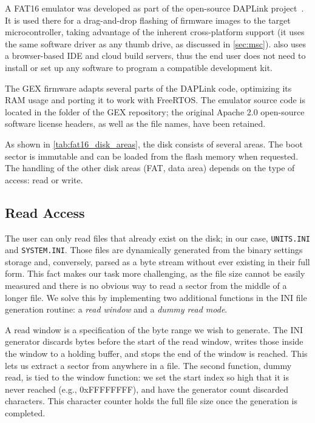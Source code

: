 A FAT16 emulator was developed as part of the open-source \mbed DAPLink project~\cite{daplink}. It is used there for a drag-and-drop flashing of firmware images to the target microcontroller, taking advantage of the inherent cross-platform support (it uses the same software driver as any thumb drive, as discussed in \cref{sec:msc}). \mbed also uses a browser-based \gls{IDE} and cloud build servers, thus the end user does not need to install or set up any software to program a compatible development kit.

The GEX firmware adapts several parts of the DAPLink code, optimizing its \gls{RAM} usage and porting it to work with FreeRTOS. The emulator source code is located in the  folder of the GEX repository; the original Apache 2.0 open-source software license headers, as well as the file names, have been retained.

As shown in \cref{tab:fat16_disk_areas}, the disk consists of several areas. The boot sector is immutable and can be loaded from the flash memory when requested. The handling of the other disk areas (\gls{FAT}, data area) depends on the type of access: read or write.

\subsection{Read Access}

The user can only read files that already exist on the disk; in our case, \verb|UNITS.INI| and \verb|SYSTEM.INI|. Those files are dynamically generated from the binary settings storage and, conversely, parsed as a byte stream without ever existing in their full form. This fact makes our task more challenging, as the file size cannot be easily measured and there is no obvious way to read a sector from the middle of a longer file. We solve this by implementing two additional functions in the INI file generation routine: a \textit{read window} and a \textit{dummy read mode}.

A read window is a specification of the byte range we wish to generate. The INI generator discards bytes before the start of the read window, writes those inside the window to a holding buffer, and stops the end of the window is reached. This lets us extract a sector from anywhere in a file. The second function, dummy read, is tied to the window function: we set the start index so high that it is never reached (e.g., 0xFFFFFFFF), and have the generator count discarded characters. This character counter holds the full file size once the generation is completed.

